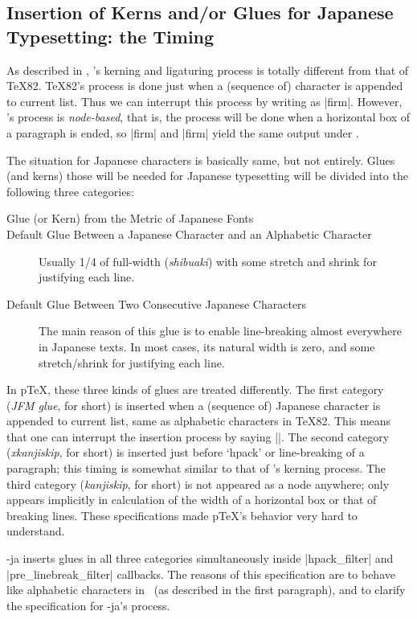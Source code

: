 \documentclass{ajt}
\begin{document}
\subsection{Insertion of Kerns and/or Glues for Japanese Typesetting: the Timing}
\label{ssec-jglue}

As described in \cite{luatexref}, \LuaTeX's kerning and ligaturing
process is totally different from that of \TeX82.  \TeX82's process is
done just when a (sequence of) character is appended to current
list. Thus we can interrupt this process by writing as
|f{}irm|. However, \LuaTeX's process is \emph{node-based}, that is, the
process will be done when a horizontal box of a paragraph is ended, so
|f{}irm| and |firm| yield the same output under \LuaTeX.

The situation for Japanese characters is basically same, but not
entirely.  Glues (and kerns) those will be needed for Japanese
typesetting will be divided into the following three categories:
\begin{description}
\item[Glue (or Kern) from the Metric of Japanese Fonts] 
\item[Default Glue Between a Japanese Character and an Alphabetic Character] 
Usually 1/4 of full-width (\emph{shibuaki}) with some stretch and shrink for justifying
	   each line.
\item[Default Glue Between Two Consecutive Japanese Characters] 
The main reason of this glue is to enable line-breaking almost
	   everywhere in Japanese texts. In most cases, its natural
	   width is zero, and
some stretch/shrink for justifying each line. 
\end{description}
In p\TeX, these three kinds of glues are treated differently. The first
 category (\emph{JFM glue}, for short) is inserted when a (sequence of)
 Japanese character is appended to current list, same as alphabetic
 characters in \TeX82. This means that one can interrupt the insertion
 process by saying |{}|.  The second category (\emph{xkanjiskip}, for
 short) is inserted just before `hpack' or line-breaking of a paragraph;
 this timing is somewhat similar to that of \LuaTeX's kerning
 process. The third category (\emph{kanjiskip}, for short) is not
 appeared as a node anywhere; only appears implicitly in calculation of
 the width of a horizontal box or that of breaking lines. These
 specifications made p\TeX's behavior very hard to understand.

\LuaTeX-ja inserts glues in all three categories simultaneously inside
|hpack_filter| and |pre_linebreak_filter| callbacks.  The reasons of
this specification are to behave like alphabetic characters in \LuaTeX\
(as described in the first paragraph), and to clarify the specification
for \LuaTeX-ja's process.
\end{document}
